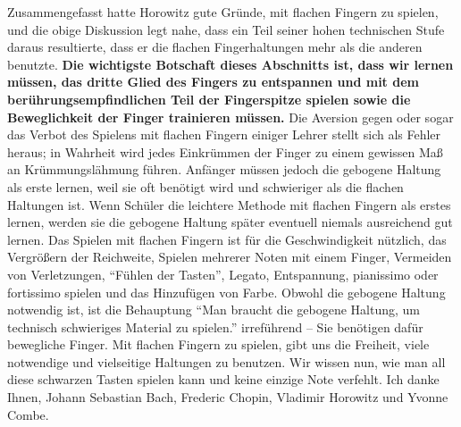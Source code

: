 Zusammengefasst hatte Horowitz gute Gründe, mit flachen Fingern zu spielen, und die obige Diskussion legt nahe, dass ein Teil seiner hohen technischen Stufe daraus resultierte, dass er die flachen Fingerhaltungen mehr als die anderen benutzte.
\textbf{Die wichtigste Botschaft dieses Abschnitts ist, dass wir lernen müssen, das dritte Glied des Fingers zu entspannen und mit dem berührungsempfindlichen Teil der Fingerspitze spielen sowie die Beweglichkeit der Finger trainieren müssen.}
Die Aversion gegen oder sogar das Verbot des Spielens mit flachen Fingern einiger Lehrer stellt sich als Fehler heraus; in Wahrheit wird jedes Einkrümmen der Finger zu einem gewissen Maß an Krümmungslähmung führen.
Anfänger müssen jedoch die gebogene Haltung als erste lernen, weil sie oft benötigt wird und schwieriger als die flachen Haltungen ist.
Wenn Schüler die leichtere Methode mit flachen Fingern als erstes lernen, werden sie die gebogene Haltung später eventuell niemals ausreichend gut lernen.
Das Spielen mit flachen Fingern ist für die Geschwindigkeit nützlich, das Vergrößern der Reichweite, Spielen mehrerer Noten mit einem Finger, Vermeiden von Verletzungen, \enquote{Fühlen der Tasten}, Legato, Entspannung, pianissimo oder fortissimo spielen und das Hinzufügen von Farbe.
Obwohl die gebogene Haltung notwendig ist, ist die Behauptung \enquote{Man braucht die gebogene Haltung, um technisch schwieriges Material zu spielen.} irreführend -- Sie benötigen dafür bewegliche Finger.
Mit flachen Fingern zu spielen, gibt uns die Freiheit, viele notwendige und vielseitige Haltungen zu benutzen.
Wir wissen nun, wie man all diese schwarzen Tasten spielen kann und keine einzige Note verfehlt.
Ich danke Ihnen, Johann Sebastian Bach, Frederic Chopin, Vladimir Horowitz und Yvonne Combe.




